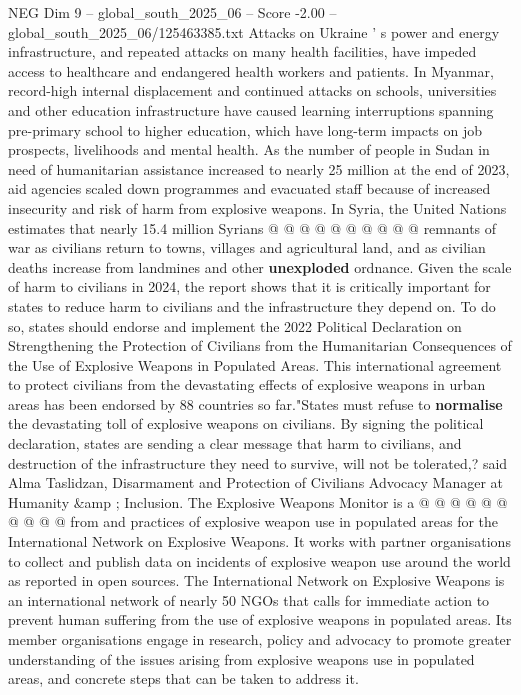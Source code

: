 \begin{textsample}{NEG Dim 9 – global\_south\_2025\_06 – Score -2.00 – global\_south\_2025\_06/125463385.txt}
Attacks on Ukraine ' s power and energy infrastructure, and repeated attacks on many health facilities, have impeded access to healthcare and endangered health workers and patients.
In Myanmar, record-high internal displacement and continued attacks on schools, universities and other education infrastructure have caused learning interruptions spanning pre-primary school to higher education, which have long-term impacts on job prospects, livelihoods and mental health.
As the number of people in Sudan in need of humanitarian assistance increased to nearly 25 million at the end of 2023, aid agencies scaled down programmes and evacuated staff because of increased insecurity and risk of harm from explosive weapons.
In Syria, the United Nations estimates that nearly 15.4 million Syrians @ @ @ @ @ @ @ @ @ @ remnants of war as civilians return to towns, villages and agricultural land, and as civilian deaths increase from landmines and other \textbf{unexploded} ordnance.
Given the scale of harm to civilians in 2024, the report shows that it is critically important for states to reduce harm to civilians and the infrastructure they depend on.
To do so, states should endorse and implement the 2022 Political Declaration on Strengthening the Protection of Civilians from the Humanitarian Consequences of the Use of Explosive Weapons in Populated Areas.
This international agreement to protect civilians from the devastating effects of explosive weapons in urban areas has been endorsed by 88 countries so far."States must refuse to \textbf{normalise} the devastating toll of explosive weapons on civilians.
By signing the political declaration, states are sending a clear message that harm to civilians, and destruction of the infrastructure they need to survive, will not be tolerated,? said Alma Taslidzan, Disarmament and Protection of Civilians Advocacy Manager at Humanity \&amp ; Inclusion.
The Explosive Weapons Monitor is a @ @ @ @ @ @ @ @ @ @ from and practices of explosive weapon use in populated areas for the International Network on Explosive Weapons.
It works with partner organisations to collect and publish data on incidents of explosive weapon use around the world as reported in open sources.
The International Network on Explosive Weapons is an international network of nearly 50 NGOs that calls for immediate action to prevent human suffering from the use of explosive weapons in populated areas.
Its member organisations engage in research, policy and advocacy to promote greater understanding of the issues arising from explosive weapons use in populated areas, and concrete steps that can be taken to address it.

\end{textsample}
